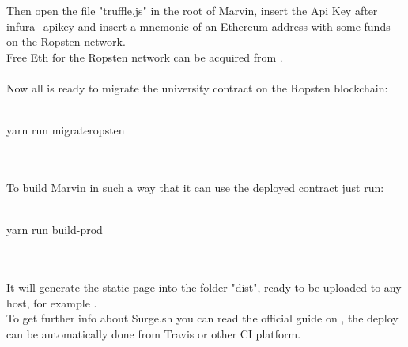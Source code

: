 \documentclass[ManualeSviluppatore]{subfiles}
\begin{document}
Then open the file "truffle.js" in the root of Marvin, insert the Api Key after infura\_apikey and insert a mnemonic of an Ethereum address with some funds on the Ropsten network.\\
Free Eth for the Ropsten network can be acquired from .\\\\
Now all is ready to migrate the university contract on the Ropsten blockchain: \\\\
\begin{ttfamily} \indent yarn run migrateropsten \end{ttfamily} \\\\
To build Marvin in such a way that it can use the deployed contract just run:  \\\\
\begin{ttfamily} \indent yarn run build-prod \end{ttfamily} \\\\
It will generate the static page into the folder "dist", ready to be uploaded to any host, for example . \\

To get further info about Surge.sh you can read the official guide on , the deploy can be automatically done from Travis or other CI platform.
\end{document}
